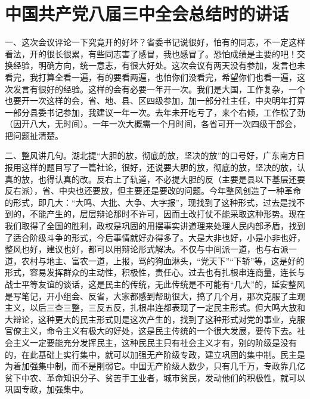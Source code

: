 \section[中国共产党八届三中全会总结时的讲话（一九五七年十月九日）]{中国共产党八届三中全会总结时的讲话}


一、这次会议评论一下究竟开的好坏？省委书记说很好，怕有的同志，不一定这样看法，开的很长很累，有些同志害了感冒，我也感冒了。恐怕成绩是主要的吧！交换经验，明确方向，统一意志，有很大好处。这次会议有两天没有参加，发言也未看完，我打算全看一遍，有的要看两遍，也怕你们没看完，希望你们也看一遍，这次发言有很好的经验。这样的会有必要一年开一次。我们是大国，工作复杂，一个也要开一次这样的会，省、地、县、区四级参加，加一部分社主任，中央明年打算一部分县委书记参加，我建议一年一次。去年未开吃亏了，来个右倾，工作松了劲（因开八大，无时间）。一年一次大概需一个月时间，各省可开一次四级干部会，把问题扯清楚。

二、整风讲几句。湖北提“大胆的放，彻底的放，坚决的放”的口号好，广东南方日报用这样的题目写了一篇社论，很好，还说要大胆的放，彻底的放，坚决的放，认真的放，也得认真的改。反右上了轨道，不必提大胆的反（主要是县以下基层还要反右派），省、中央也还要放，但主要还是要改的问题。今年整风创造了一种革命的形式，即几大：“大鸣、大批、大争、大字报”，现找到了这种形式，过去是找不到的，不能产生的，层层辩论那时不许可，因而土改打仗不能采取这种形势。现在我们取得了全国的胜利，政权是巩固的用摆事实讲道理来处理人民内部矛盾，找到了适合阶级斗争的形式，今后事情就好办得多了。大是大非也好，小是小非也好，整风也好，建议也好，都可以用辩论形式解决。不仅与中间派一道，也与右派一道，农村与地主、富农一道，上报，骂的狗血淋头，“党天下”“下轿”等，这是好的形式，容易发挥群众的主动性，积极性，责任心。过去也有扎根串连商量，连长与战士平等友谊的谈话，这是民主的传统，无此传统是不可能有“几大”的，延安整风是写笔记，开小组会、反省，大家都感到帮助很大，搞了几个月，那次克服了主观主义，以后三查三整，三反五反，扎根串连都表现了一定民主形式。但大鸣大放和大辩论，这种更大的民主形式则是这次产生的，找到了这种形式对党的事业，克服官僚主义，命令主义有极大的好处，这是民主传统的一个很大发展，要传下去。社会主义一定要能充分发挥民主，这种民民主只有社会主义才有，别的阶级是没有的，在此基础上实行集中，就可以加强无产阶级专政，建立巩固的集中制。民主是为着加强集中制，而不是削弱它。中国无产阶级人数少，只有几千万，专政靠几亿贫下中农、革命知识分子、贫苦手工业者，城市贫民，发动他们的积极性，就可以巩固专政，加强集中。


